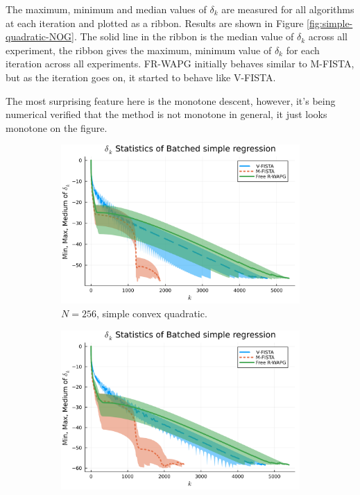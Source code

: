 \documentclass[12pt]{article}
\begin{document}
            The maximum, minimum and median values of $\delta_k$ are measured for all algorithms at each iteration and plotted as a ribbon. 
            Results are shown in Figure \ref{fig:simple-quadratic-NOG}.
            The solid line in the ribbon is the median value of $\delta_k$ across all experiment, the ribbon gives the maximum, minimum value of $\delta_k$ for each iteration across all experiments. 
            FR-WAPG initially behaves similar to M-FISTA, but as the iteration goes on, it started to behave like V-FISTA.  
            \par 
            The most surprising feature here is the monotone descent, however, it's being numerical verified that the method is not monotone in general, it just looks monotone on the figure. 
            \begin{figure}[H]
                \begin{subfigure}[b]{0.47\textwidth}
                    \centering
                    \includegraphics[width=\textwidth]{assets/simple_regression_batched-256.png}
                    \caption{$N = 256$, simple convex quadratic.}
                \end{subfigure}
                \hfill
                \begin{subfigure}[b]{0.47\textwidth}
                    \centering
                    \includegraphics[width=\textwidth]{assets/simple_regression_batched-1024.png}

\end{subfigure}
\end{figure}
\end{document}
